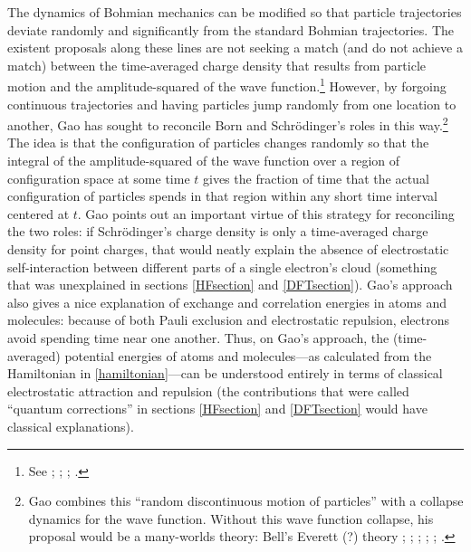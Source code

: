 \documentclass[onecolumn,secnumarabic,amsmath,amssymb,balancelastpage,nofootinbib]{article}
\begin{document}
The dynamics of Bohmian mechanics can be modified so that particle trajectories deviate randomly and significantly from the standard Bohmian trajectories.  The existent proposals along these lines are not seeking a match (and do not achieve a match) between the time-averaged charge density that results from particle motion and the amplitude-squared of the wave function.\footnote{See \cite{nelson1985, goldstein1987, bohmhiley1989}; \cite[pg.\ 645]{nelson1990}; \cite{bacciagaluppi1999}; \cite[footnote 5]{gao2018}.}  However, by forgoing continuous trajectories and having particles jump randomly from one location to another, Gao \cite{gao2014, gao2017, gao2018, gao2020} has sought to reconcile Born and Schr\"{o}dinger's roles in this way.\footnote{Gao \cite[ch.\ 8]{gao2017} combines this ``random discontinuous motion of particles'' with a collapse dynamics for the wave function.  Without this wave function collapse, his proposal would be a many-worlds theory: Bell's Everett (?) theory \cite{bell1981}; \cite[sec.\ 5.1]{barrett1999}; \cite[sec.\ 6.2]{allori2008}; \cite[sec.\ 4]{allori2011}; \cite{maudlin2016}; \cite[ch.\ 8]{gao2017}.}  The idea is that the configuration of particles changes randomly so that the integral of the amplitude-squared of the wave function over a region of configuration space at some time $t$ gives the fraction of time that the actual configuration of particles spends in that region within any short time interval centered at $t$.  Gao points out an important virtue of this strategy for reconciling the two roles: if Schr\"{o}dinger's charge density is only a time-averaged charge density for point charges, that would neatly explain the absence of electrostatic self-interaction between different parts of a single electron's cloud (something that was unexplained in sections \ref{HFsection} and \ref{DFTsection}).  Gao's approach also gives a nice explanation of exchange and correlation energies in atoms and molecules: because of both Pauli exclusion and electrostatic repulsion, electrons avoid spending time near one another.  Thus, on Gao's approach, the (time-averaged) potential energies of atoms and molecules---as calculated from the Hamiltonian in \eqref{hamiltonian}---can be understood entirely in terms of classical electrostatic attraction and repulsion (the contributions that were called ``quantum corrections'' in sections \ref{HFsection} and \ref{DFTsection} would have classical explanations). 
\end{document}
